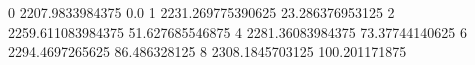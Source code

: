 0 2207.9833984375 0.0
1 2231.269775390625 23.286376953125
2 2259.611083984375 51.627685546875
4 2281.36083984375 73.37744140625
6 2294.4697265625 86.486328125
8 2308.1845703125 100.201171875
